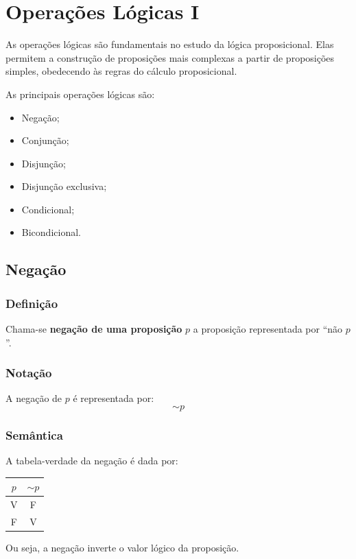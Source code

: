 \chapter{Operações Lógicas I}

As operações lógicas são fundamentais no estudo da lógica proposicional. Elas permitem a construção de proposições mais complexas a partir de proposições simples, obedecendo às regras do cálculo proposicional.

As principais operações lógicas são:
\begin{itemize}
    \item Negação;
    \item Conjunção;
    \item Disjunção;
    \item Disjunção exclusiva;
    \item Condicional;
    \item Bicondicional.
\end{itemize}

\section{Negação}

\subsection{Definição}
Chama-se \textbf{negação de uma proposição} $p$ a proposição representada por ``não $p$''.

\subsection{Notação}
A negação de $p$ é representada por:
\[
\sim p
\]

\subsection{Semântica}
A tabela-verdade da negação é dada por:

\begin{center}
\begin{tabular}{|c|c|}
\hline
$p$ & $\sim p$ \\
\hline
V & F \\
F & V \\
\hline
\end{tabular}
\end{center}

Ou seja, a negação inverte o valor lógico da proposição.


